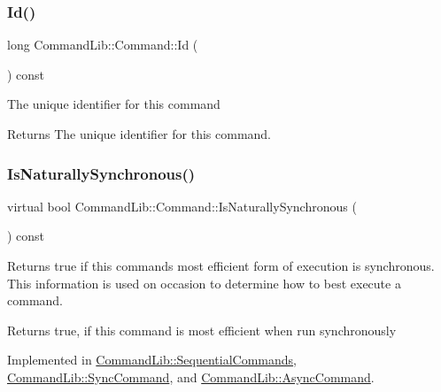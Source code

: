 \mbox{\label{class_command_lib_1_1_command_a00a3047609fda3d69b828b7850624389}} 
\subsubsection{\texorpdfstring{Id()}{Id()}}
{\footnotesize\ttfamily long Command\+Lib\+::\+Command\+::\+Id (\begin{DoxyParamCaption}{ }\end{DoxyParamCaption}) const}



The unique identifier for this command

\begin{DoxyReturn}{Returns}
The unique identifier for this command. 
\end{DoxyReturn}
\mbox{\label{class_command_lib_1_1_command_a4ccad987c43709c44c20132c3890b585}} 
\subsubsection{\texorpdfstring{Is\+Naturally\+Synchronous()}{IsNaturallySynchronous()}}
{\footnotesize\ttfamily virtual bool Command\+Lib\+::\+Command\+::\+Is\+Naturally\+Synchronous (\begin{DoxyParamCaption}{ }\end{DoxyParamCaption}) const\hspace{0.3cm}{\ttfamily [pure virtual]}}



Returns true if this command\textquotesingle{}s most efficient form of execution is synchronous. This information is used on occasion to determine how to best execute a command. 

\begin{DoxyReturn}{Returns}
true, if this command is most efficient when run synchronously
\end{DoxyReturn}


Implemented in \mbox{\hyperlink{class_command_lib_1_1_sequential_commands_a47c2a881bfeab639064e36d202e32e0f}{Command\+Lib\+::\+Sequential\+Commands}}, \mbox{\hyperlink{class_command_lib_1_1_sync_command_a7541276e393c002979ed54523116b12e}{Command\+Lib\+::\+Sync\+Command}}, and \mbox{\hyperlink{class_command_lib_1_1_async_command_a2c08165637770cc7bb8fdd814a93acec}{Command\+Lib\+::\+Async\+Command}}.

